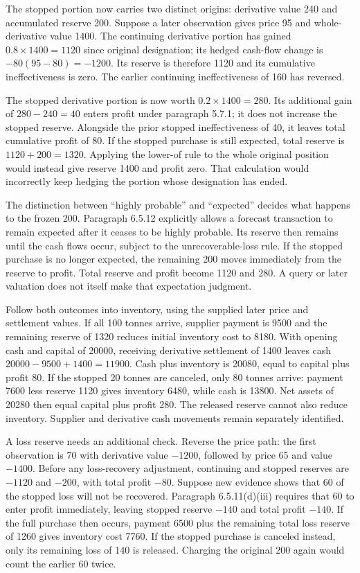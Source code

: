 The stopped portion now carries two distinct origins: derivative value 240
and accumulated reserve 200. Suppose a later observation gives price 95
and whole-derivative value 1400. The continuing derivative portion has gained
\(0.8\times1400=1120\) since original designation; its hedged cash-flow
change is \(-80(95-80)=-1200\). Its reserve is therefore 1120 and its
cumulative ineffectiveness is zero. The earlier continuing ineffectiveness
of 160 has reversed.

The stopped derivative portion is now worth \(0.2\times1400=280\).
Its additional gain of \(280-240=40\) enters profit under paragraph 5.7.1;
it does not increase the stopped reserve. Alongside the prior stopped
ineffectiveness of 40, it leaves total cumulative profit of 80. If the
stopped purchase is still expected, total reserve is
\(1120+200=1320\). Applying the lower-of rule to the whole original
position would instead give reserve 1400 and profit zero. That calculation
would incorrectly keep hedging the portion whose designation has ended.

The distinction between ``highly probable'' and ``expected'' decides what
happens to the frozen 200. Paragraph 6.5.12 explicitly allows a forecast
transaction to remain expected after it ceases to be highly probable.
Its reserve then remains until the cash flows occur, subject to the
unrecoverable-loss rule. If the stopped purchase is no longer expected,
the remaining 200 moves immediately from the reserve to profit. Total
reserve and profit become 1120 and 280. A query or later valuation does
not itself make that expectation judgment.

Follow both outcomes into inventory, using the supplied later price and
settlement values. If all 100 tonnes arrive, supplier payment is 9500
and the remaining reserve of 1320 reduces initial inventory cost to 8180.
With opening cash and capital of 20000, receiving derivative settlement
of 1400 leaves cash \(20000-9500+1400=11900\). Cash plus inventory
is 20080, equal to capital plus profit 80. If the stopped 20 tonnes are
canceled, only 80 tonnes arrive: payment 7600 less reserve 1120 gives
inventory 6480, while cash is 13800. Net assets of 20280 then equal
capital plus profit 280. The released reserve cannot also reduce inventory.
Supplier and derivative cash movements remain separately identified.

A loss reserve needs an additional check. Reverse the price path: the first
observation is 70 with derivative value \(-1200\), followed by price 65
and value \(-1400\). Before any loss-recovery adjustment, continuing and
stopped reserves are \(-1120\) and \(-200\), with total profit
\(-80\). Suppose new evidence shows that 60 of the stopped loss will
not be recovered. Paragraph 6.5.11(d)(iii) requires that 60 to enter
profit immediately, leaving stopped reserve \(-140\) and total profit
\(-140\). If the full purchase then occurs, payment 6500 plus the
remaining total loss reserve of 1260 gives inventory cost 7760. If the
stopped purchase is canceled instead, only its remaining loss of 140 is
released. Charging the original 200 again would count the earlier 60 twice.

